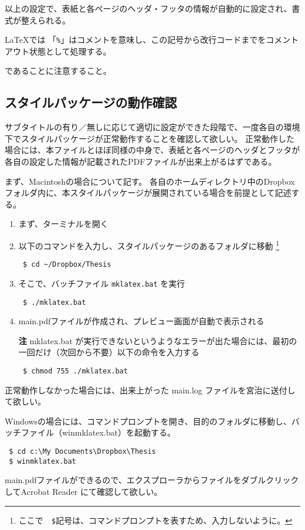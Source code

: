 以上の設定で、表紙と各ページのヘッダ・フッタの情報が自動的に設定され、書式が整えられる。
\begin{boxnote}
\LaTeX では 「\verb+%+」はコメントを意味し、この記号から改行コードまでをコメントアウト状態として処理する。
\end{boxnote}
であることに注意すること。

\subsection{スタイルパッケージの動作確認}
サブタイトルの有り／無しに応じて適切に設定ができた段階で、一度各自の環境下でスタイルパッケージが正常動作することを確認して欲しい。
正常動作した場合には、本ファイルとほぼ同様の中身で、表紙と各ページのヘッダとフッタが各自の設定した情報が記載されたPDFファイルが出来上がるはずである。

まず、Macintoshの場合について記す。
各自のホームディレクトリ中のDropboxフォルダ内に、本スタイルパッケージが展開されている場合を前提として記述する。
\begin{enumerate}
\item まず、ターミナルを開く
\item 以下のコマンドを入力し、スタイルパッケージのあるフォルダに移動
\footnote{ここで　\verb+$+記号は、コマンドプロンプトを表すため、入力しないように。}
\begin{screen}
{\small
\begin{verbatim}
 $ cd ~/Dropbox/Thesis
\end{verbatim}
}
\end{screen}

\item そこで、バッチファイル \verb+mklatex.bat+ を実行
\begin{screen}
{\small
\begin{verbatim}
 $ ./mklatex.bat
\end{verbatim}
}
\end{screen}

\item main.pdfファイルが作成され、プレビュー画面が自動で表示される
\item[\textbf{注}] mklatex.bat が実行できないというようなエラーが出た場合には、最初の一回だけ（次回から不要）以下の命令を入力する
\begin{screen}
{\small
\begin{verbatim}
 $ chmod 755 ./mklatex.bat
\end{verbatim}
}
\end{screen}
\end{enumerate}

正常動作しなかった場合には、出来上がった main.log ファイルを宮治に送付して欲しい。

Windowsの場合には、コマンドプロンプトを開き、目的のフォルダに移動し、バッチファイル（winmklatex.bat）を起動する。
\begin{screen}
{\small
\begin{verbatim}
 $ cd c:\My Documents\Dropbox\Thesis
 $ winmklatex.bat
\end{verbatim}
}
\end{screen}
main.pdfファイルができるので、エクスプローラからファイルをダブルクリックしてAcrobat Reader にて確認して欲しい。

